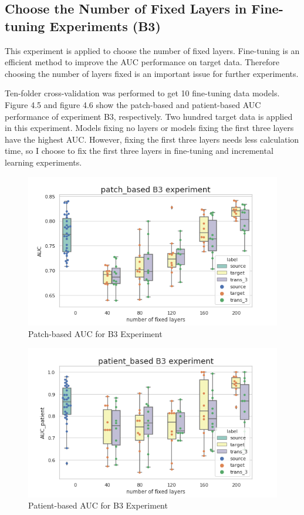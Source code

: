 \subsection{Choose the Number of Fixed Layers in Fine-tuning Experiments (B3)}
This experiment is applied to choose the number of fixed layers. Fine-tuning is an efficient method to improve the AUC performance on target data. Therefore choosing the number of layers fixed is an important issue for further experiments.

Ten-folder cross-validation was performed to get 10 fine-tuning data models. Figure 4.5 and figure 4.6 show the patch-based and patient-based AUC performance of experiment B3, respectively. Two hundred target data is applied in this experiment. Models fixing no layers or models fixing the first three layers have the highest AUC. However, fixing the first three layers needs less calculation time, so I choose to fix the first three layers in fine-tuning and incremental learning experiments. 
\begin{figure}[H]
    \hfil
    \begin{minipage}[t]{0.9\textwidth}
        \includegraphics[width=\textwidth]{fig/B3_num_patch.png}
        \caption{\label{fig:parallel1}Patch-based AUC for B3 Experiment}
    \end{minipage}
    \hfil
\end{figure}
\begin{figure}[H]
    \hfil
    \begin{minipage}[t]{0.9\textwidth}
        \includegraphics[width=\textwidth]{fig/B3_num_patient.png}
        \caption{\label{fig:parallel1} Patient-based AUC for B3 Experiment}
    \end{minipage}
    \hfil
\end{figure}


